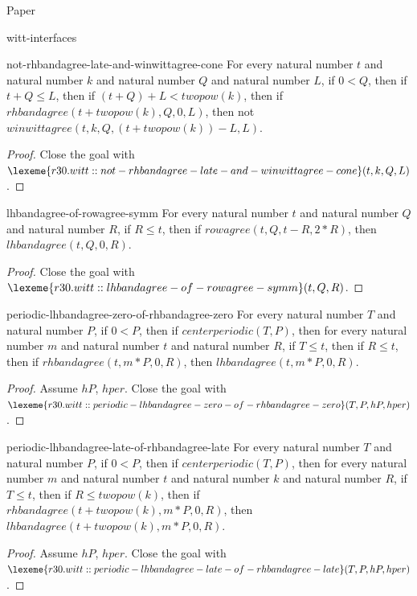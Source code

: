 \begin{lexlean}{Paper}
\begin{section}{witt-interfaces}
  \begin{theorem}{not-rhbandagree-late-and-winwittagree-cone}
  For every natural number \(t\) and natural number \(k\) and natural number \(Q\) and natural number \(L\), if \(0 < Q\), then if \(t + Q ≤ L\), then if \((t + Q) + L < twopow(k)\), then if \(rhbandagree(t + twopow(k), Q, 0, L)\), then not \(winwittagree(t, k, Q, (t + twopow(k)) - L, L)\).
  \begin{proof}
  Close the goal with \(\lexeme{r30.witt::not-rhbandagree-late-and-winwittagree-cone}(t, k, Q, L)\).
  \end{proof}
  \end{theorem}

  \begin{theorem}{lhbandagree-of-rowagree-symm}
  For every natural number \(t\) and natural number \(Q\) and natural number \(R\), if \(R ≤ t\), then if \(rowagree(t, Q, t - R, 2 * R)\), then \(lhbandagree(t, Q, 0, R)\).
  \begin{proof}
  Close the goal with \(\lexeme{r30.witt::lhbandagree-of-rowagree-symm}(t, Q, R)\).
  \end{proof}
  \end{theorem}

  \begin{theorem}{periodic-lhbandagree-zero-of-rhbandagree-zero}
  For every natural number \(T\) and natural number \(P\), if \(0 < P\), then if \(centerperiodic(T, P)\), then for every natural number \(m\) and natural number \(t\) and natural number \(R\), if \(T ≤ t\), then if \(R ≤ t\), then if \(rhbandagree(t, m * P, 0, R)\), then \(lhbandagree(t, m * P, 0, R)\).
  \begin{proof}
  Assume \(hP\), \(hper\).
  Close the goal with \(\lexeme{r30.witt::periodic-lhbandagree-zero-of-rhbandagree-zero}(T, P, hP, hper)\).
  \end{proof}
  \end{theorem}

  \begin{theorem}{periodic-lhbandagree-late-of-rhbandagree-late}
  For every natural number \(T\) and natural number \(P\), if \(0 < P\), then if \(centerperiodic(T, P)\), then for every natural number \(m\) and natural number \(t\) and natural number \(k\) and natural number \(R\), if \(T ≤ t\), then if \(R ≤ twopow(k)\), then if \(rhbandagree(t + twopow(k), m * P, 0, R)\), then \(lhbandagree(t + twopow(k), m * P, 0, R)\).
  \begin{proof}
  Assume \(hP\), \(hper\).
  Close the goal with \(\lexeme{r30.witt::periodic-lhbandagree-late-of-rhbandagree-late}(T, P, hP, hper)\).
  \end{proof}
  \end{theorem}


\end{section}
\end{lexlean}
